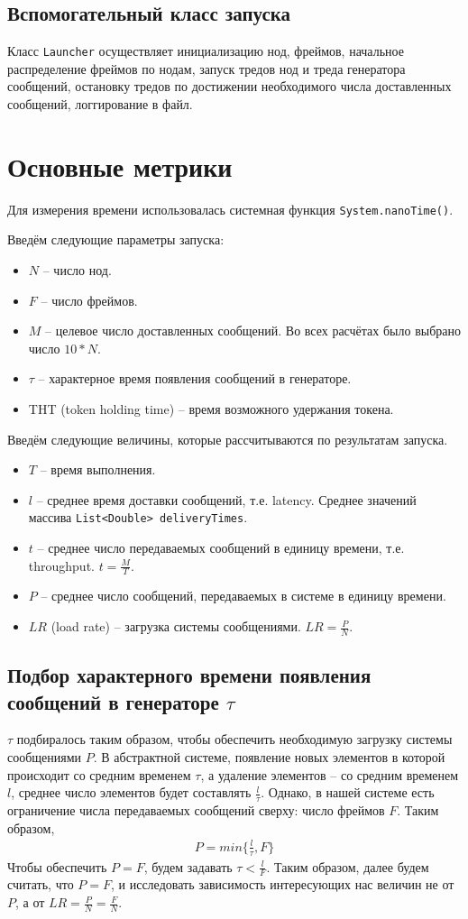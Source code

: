\documentclass{article}
\begin{document}
\subsection{Вспомогательный класс запуска}
Класс \lstinline|Launcher| осуществляет инициализацию нод, фреймов, начальное распределение фреймов по нодам, запуск тредов нод и треда генератора сообщений, остановку тредов по достижении необходимого числа доставленных сообщений, логгирование в файл.

\section{Основные метрики}
Для измерения времени использовалась системная функция \lstinline|System.nanoTime()|.

Введём следующие параметры запуска:
\begin{itemize}
\item $N$ – число нод.
\item $F$ – число фреймов. 
\item $M$ – целевое число доставленных сообщений. Во всех расчётах было выбрано число $10*N$.
\item $\tau$ – характерное время появления сообщений в генераторе. 
\item THT (token holding time) – время возможного удержания токена.
\end{itemize}

Введём следующие величины, которые рассчитываются по результатам запуска.
\begin{itemize}
\item $T$ – время выполнения.
\item $l$ – среднее время доставки сообщений, т.е. latency. Среднее значений массива \lstinline|List<Double> deliveryTimes|.
\item $t$ – среднее число передаваемых сообщений в единицу времени, т.е. throughput. $t = \frac{M}{T}$.
\item $P$ – среднее число сообщений, передаваемых в системе в единицу времени.
\item $LR$ (load rate) – загрузка системы сообщениями. $LR = \frac{P}{N}$.
\end{itemize}

\subsection{Подбор характерного времени появления сообщений в генераторе $\tau$}
$\tau$ подбиралось таким образом, чтобы обеспечить необходимую загрузку системы сообщениями $P$.
В абстрактной системе, появление новых элементов в которой происходит со средним временем $\tau$, а удаление элементов – со средним временем $l$, среднее число элементов будет составлять $\frac{l}{\tau}$. Однако, в нашей системе есть ограничение числа передаваемых сообщений сверху: число фреймов $F$. Таким образом, 
\begin{gather}
P=min\{\frac{l}{\tau}, F\}
\end{gather}
Чтобы обеспечить $P=F$, будем задавать $\tau < {\frac{l}{F}}$.
Таким образом, далее будем считать, что $P=F$, и исследовать зависимость интересующих нас величин не от $P$, а от $LR= \frac{P}{N}= \frac{F}{N}$.
\end{document}
